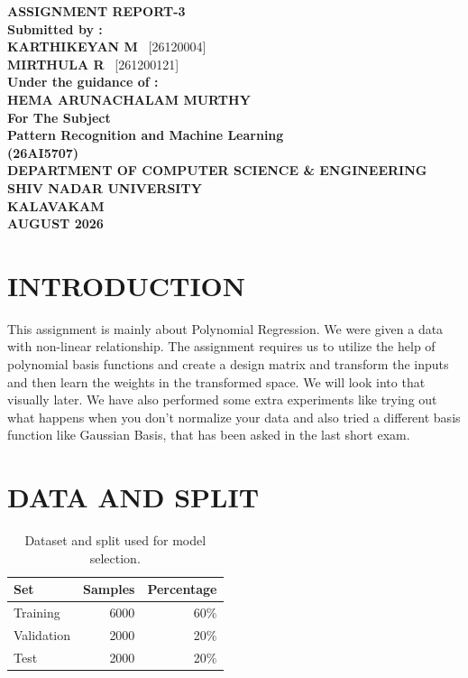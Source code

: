 \documentclass[12pt]{article}
\newcommand{\studentname}{KARTHIKEYAN M}
\newcommand{\registernumber}{26120004}
\newcommand{\teammatename}{MIRTHULA R}
\newcommand{\teammateregister}{261200121}
\newcommand{\submissionmonth}{AUGUST 2026}
\begin{document}
\begin{titlepage}
\centering
\vspace*{2cm}
{\Large \textbf{ASSIGNMENT REPORT-3}}\\[2cm]

\textbf{Submitted by :}\\[0.3cm]
\textbf{\studentname} \ [\registernumber]\\[0.3cm]
\textbf{\teammatename} \ [\teammateregister]\\[2cm]

\textbf{Under the guidance of :}\\[0.3cm]
\textbf{HEMA ARUNACHALAM MURTHY}\\[1.5cm]

\textbf{For The Subject}\\[0.5cm]
{\Large \textbf{Pattern Recognition and Machine Learning}}\\[0.3cm]
\textbf{(26AI5707)}\\[3cm]

\vfill
\textbf{DEPARTMENT OF COMPUTER SCIENCE \& ENGINEERING}\\[0.3cm]
\textbf{SHIV NADAR UNIVERSITY}\\[0.3cm]
\textbf{KALAVAKAM}\\[1.5cm]
\textbf{\submissionmonth}
\end{titlepage}

\section*{INTRODUCTION}

This assignment is mainly about Polynomial Regression. We were given a data with non-linear relationship. The assignment requires us to utilize the help of polynomial basis functions and create a design matrix and transform the inputs and then learn the weights in the transformed space. We will look into that visually later. We have also performed some extra experiments like trying out what happens when you don't normalize your data and also tried a different basis function like Gaussian Basis, that has been asked in the last short exam.

\section*{DATA AND SPLIT}

\begin{table}[H]
  \centering
  \caption{Dataset and split used for model selection.}
  \begin{tabular}{lrr}
    \toprule
    Set & Samples & Percentage \\
    \midrule
    Training & 6000 & 60\% \\
    Validation & 2000 & 20\% \\
    Test & 2000 & 20\% \\
    \bottomrule
  \end{tabular}
\end{table}
\end{document}
